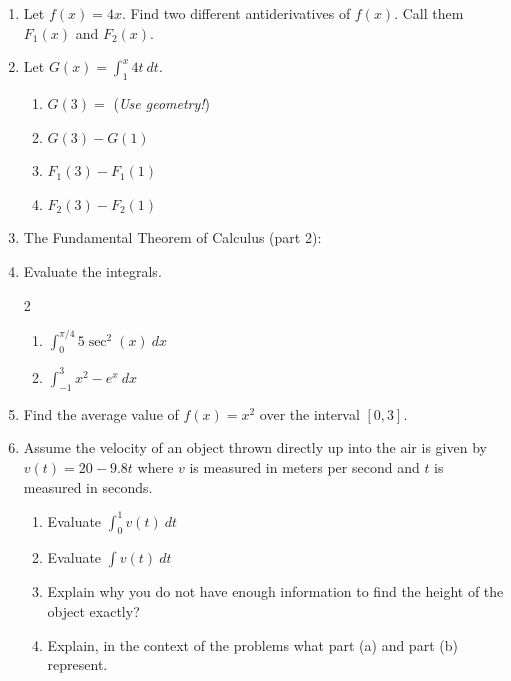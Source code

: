 \documentclass[11pt,fleqn]{article}
\renewcommand{\d}{\displaystyle}
\begin{document}
\begin{enumerate}
\item Let $f(x)=4x.$ Find two different antiderivatives of $f(x)$. Call them $F_1(x)$ and $F_2(x).$
\vfill
\item Let $G(x)= \int_1^x 4t \: dt.$ 
	\begin{enumerate}
	\item $G(3)=$ \hfill(\emph{Use geometry!})
	\vfill
	\item $G(3)-G(1)$
	\vfill
	\item $F_{1}(3)-F_{1}(1)$
	\vfill
	\item $F_{2}(3)-F_{2}(1)$
	\end{enumerate}
\newpage
\item The Fundamental Theorem of Calculus (part 2):
\vfill
\item Evaluate the integrals.
	\begin{multicols}{2}
	\begin{enumerate}
	\item $\d \int_0^{\pi/4} 5\sec^{2}(x) \: dx$
	\item $\d \int_{-1}^3 x^{2}-e^x \: dx$
	\end{enumerate}
	\end{multicols}
\vfill
\item Find the average value of $f(x)=x^2$ over the interval $[0,3].$
\vfill
\item Assume the velocity of an object thrown directly up into the air is given by $v(t)= 20-9.8t$ where $v$ is measured in meters per second and $t$ is measured in seconds. 
	\begin{enumerate}
	\item Evaluate $\int_0^1 v(t) \: dt$
	\vfill
	\item Evaluate $\int v(t) \: dt$
	\vfill
	\item Explain why you do not have enough information to find the height of the object exactly?
	\vfill
	\item Explain, in the context of the problems what part (a) and part (b) represent.
	\vfill
	\end{enumerate}

\end{enumerate}
\end{document}
